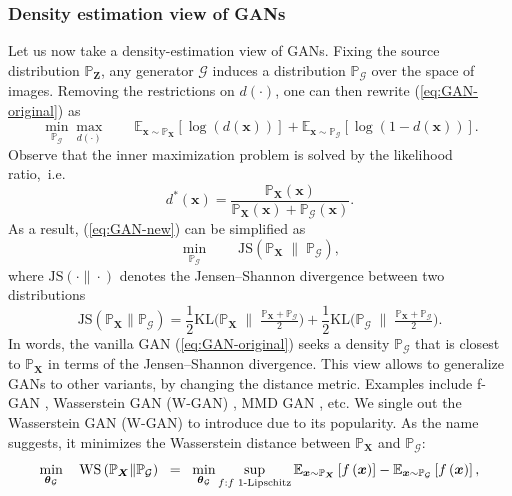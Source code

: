 \subsubsection{Density estimation view of GANs}
Let us now take a density-estimation view of GANs. Fixing the source distribution $\mathbb{P}_{\bm{Z}}$, any generator $\mathcal{G}$ induces a distribution $\mathbb{P}_{\mathcal{G}}$ over the space of images. Removing the restrictions on $d(\cdot)$, one can then rewrite (\ref{eq:GAN-original}) as
\begin{equation}\label{eq:GAN-new}
\min_{\mathbb{P}_{\mathcal{G}}}\max_{d(\cdot)}\qquad\mathbb{E}_{\bm{x}\sim\mathbb{P}_{\bm{X}}}\left[\log\left(d\left(\bm{x}\right)\right)\right]+\mathbb{E}_{\bm{x}\sim\mathbb{P}_{\mathcal{G}}}\left[\log\left(1-d\left(\bm{x}\right)\right)\right].
\end{equation}
Observe that the inner maximization problem
is solved by the likelihood ratio,~i.e.
\[
d^{*}\left(\bm{x}\right)=\frac{\mathbb{P}_{\bm{X}}\left(\bm{x}\right)}{\mathbb{P}_{\bm{X}}\left(\bm{x}\right)+\mathbb{P}_{\mathcal{G}}\left(\bm{x}\right)}.
\]
As a result, (\ref{eq:GAN-new}) can be simplified as
\begin{equation}
\min_{\mathbb{P}_{\mathcal{G}}}\qquad\text{JS}\left(\mathbb{P}_{\bm{X}}\;\|\;\mathbb{P}_{\mathcal{G}}\right)\label{eq:JS-min},
\end{equation}
where $\text{JS}(\cdot\|\cdot)$ denotes the Jensen--Shannon divergence
between two distributions
\[
\text{JS}\left(\mathbb{P}_{\bm{X}}\|\mathbb{P}_{\mathcal{G}}\right)=\frac{1}{2}\text{KL}\big(\mathbb{P}_{\bm{X}}\;\|\;\tfrac{\mathbb{P}_{\bm{X}}+\mathbb{P}_{\mathcal{G}}}{2}\big)+\frac{1}{2}\text{KL}\big(\mathbb{P}_{\mathcal{G}}\;\|\;\tfrac{\mathbb{P}_{\bm{X}}+\mathbb{P}_{\mathcal{G}}}{2}\big).
\]
In words, the vanilla GAN (\ref{eq:GAN-original}) seeks a density $\mathbb{P}_{\mathcal{G}}$ that is closest to $\mathbb{P}_{\bm{X}}$ in terms of the Jensen--Shannon divergence. This view allows to generalize GANs to other variants, by changing the distance metric. Examples include f-GAN \citep{nowozin2016f}, Wasserstein GAN (W-GAN) \citep{arjovsky2017wasserstein}, MMD GAN \citep{li2015generative}, etc. We single out the Wasserstein GAN (W-GAN) \citep{arjovsky2017wasserstein} to introduce due to its popularity. As the name suggests, it minimizes
the Wasserstein distance between $\mathbb{P}_{\bm{X}}$ and $\mathbb{P}_{\mathcal{G}}$:
\begin{equation}
\min_{\text{\boldmath $\theta$}_{\mathcal{G}}}\quad \text{WS}\left(\mathbb{P}_{\bm{X}}\|\mathbb{P}_{\mathcal{G}}\right)\;\;=\;\;\min_{\text{\boldmath $\theta$}_{\mathcal{G}}}\sup_{f:f\text{ 1-Lipschitz}}\mathbb{E}_{\bm{x}\sim\mathbb{P}_{\bm{X}}}
\left[f\left(\bm{x}\right)\right]-\mathbb{E}_{\bm{x}\sim
\mathbb{P}_{\mathcal{G}}}\left[f\left(\bm{x}\right)\right],\label{eq:WS-GAN}
\end{equation}
